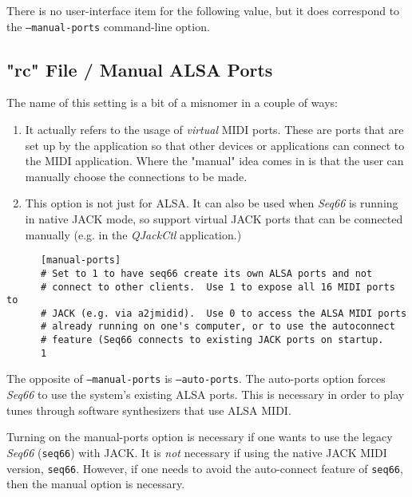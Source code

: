    There is no user-interface item for the following value, but
   it does correspond to the \texttt{--manual-ports} command-line
   option.

\subsection{"rc" File / Manual ALSA Ports}
\label{subsec:rc_file_manual_ports}

   The name of this setting is a bit of a misnomer in a couple of ways:

   \begin{enumerate}
      \item It actually refers to the usage of \textsl{virtual} MIDI ports.
         These are ports that are set up by the application so that other
         devices or applications can connect to the MIDI application.
         Where the "manual" idea comes in is that the user can manually choose
         the connections to be made.
      \item This option is not just for ALSA.  It can also be used when
         \textsl{Seq66} is running in native JACK mode, so support
         virtual JACK ports that can be connected manually (e.g. in the
         \textsl{QJackCtl} application.)
   \end{enumerate}

   \begin{verbatim}
      [manual-ports]
      # Set to 1 to have seq66 create its own ALSA ports and not
      # connect to other clients.  Use 1 to expose all 16 MIDI ports to
      # JACK (e.g. via a2jmidid).  Use 0 to access the ALSA MIDI ports
      # already running on one's computer, or to use the autoconnect
      # feature (Seq66 connects to existing JACK ports on startup.
      1
   \end{verbatim}

   The opposite of \texttt{--manual-ports}
   is \texttt{--auto-ports}.  The auto-ports option
   forces \textsl{Seq66} to use the system's existing ALSA ports.
   This is necessary in order to play tunes through software synthesizers that
   use ALSA MIDI.

   Turning on the manual-ports option is necessary if one
   wants to use the legacy \textsl{Seq66} (\texttt{seq66})
   with JACK.
   It is \textsl{not} necessary if using the native JACK MIDI version,
   \texttt{seq66}.
   However, if one needs to avoid the auto-connect feature of \texttt{seq66},
   then the manual option is necessary.

